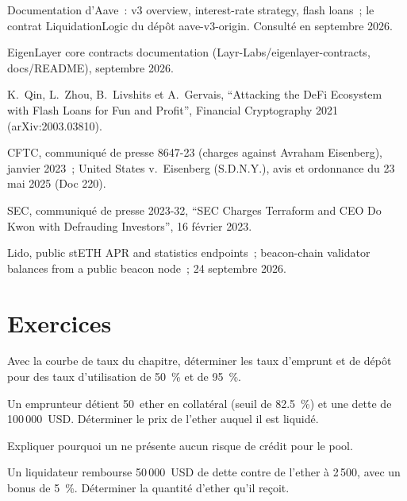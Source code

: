 \begin{omsources}
\item Documentation d'Aave~: v3 overview, interest-rate strategy, flash loans~; le contrat LiquidationLogic du dépôt aave-v3-origin. Consulté en septembre 2026.
\item EigenLayer core contracts documentation (Layr-Labs/eigenlayer-contracts, docs/README), septembre 2026.
\item K.~Qin, L.~Zhou, B.~Livshits et A.~Gervais, ``Attacking the DeFi Ecosystem with Flash Loans for Fun and Profit'', Financial Cryptography 2021
(arXiv:2003.03810).
\item CFTC, communiqué de presse 8647-23 (charges against Avraham Eisenberg), janvier 2023~; United States v.\ Eisenberg (S.D.N.Y.), avis et ordonnance du 23
mai 2025 (Doc 220).
\item SEC, communiqué de presse 2023-32, ``SEC Charges Terraform and CEO Do Kwon with Defrauding Investors'', 16 février 2023.
\item Lido, public stETH APR and statistics endpoints~; beacon-chain validator balances from a public beacon node~; 24 septembre 2026.
\end{omsources}

\section{Exercices}

\begin{exercise}[$\star$]\label{exo:m3:defi-credit-and-leverage:1}
Avec la courbe de taux du chapitre, déterminer les taux d'emprunt et de dépôt pour des taux d'utilisation de 50~\% et de 95~\%.
\end{exercise}

\begin{exercise}[$\star$]\label{exo:m3:defi-credit-and-leverage:2}
Un emprunteur détient 50~ether en collatéral (seuil de 82.5~\%) et une dette de 100\,000~USD. Déterminer le prix de l'ether auquel il est liquidé.
\end{exercise}

\begin{exercise}[$\star$]\label{exo:m3:defi-credit-and-leverage:3}
Expliquer pourquoi un  ne présente aucun risque de crédit pour le pool.
\end{exercise}

\begin{exercise}[$\star\star$]\label{exo:m3:defi-credit-and-leverage:4}
Un liquidateur rembourse 50\,000~USD de dette contre de l'ether à 2\,500, avec un bonus de 5~\%. Déterminer la quantité d'ether qu'il reçoit.
\end{exercise}

